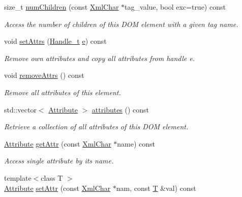 \begin{DoxyCompactItemize}
size\+\_\+t \hyperlink{class_d_d4hep_1_1_x_m_l_1_1_element_a48edbe33bd58d2d5aeb6549ed4036d7c}{num\+Children} (const \hyperlink{namespace_d_d4hep_1_1_x_m_l_a09e5d9cc86ed782f6826dfe0778c1815}{Xml\+Char} $\ast$tag\+\_\+value, bool exc=true) const
\begin{DoxyCompactList}\small\item\em Access the number of children of this D\+OM element with a given tag name. \end{DoxyCompactList}\item 
void \hyperlink{class_d_d4hep_1_1_x_m_l_1_1_element_a8209334be87a35551bbd6d4d8f7cbba4}{set\+Attrs} (\hyperlink{class_d_d4hep_1_1_x_m_l_1_1_handle__t}{Handle\+\_\+t} \hyperlink{_volumes_8cpp_a8a9a1f93e9b09afccaec215310e64142}{e}) const
\begin{DoxyCompactList}\small\item\em Remove own attributes and copy all attributes from handle \textquotesingle{}e\textquotesingle{}. \end{DoxyCompactList}\item 
void \hyperlink{class_d_d4hep_1_1_x_m_l_1_1_element_aad0a776742e12a27fba79e9dcfd06d23}{remove\+Attrs} () const
\begin{DoxyCompactList}\small\item\em Remove all attributes of this element. \end{DoxyCompactList}\item 
std\+::vector$<$ \hyperlink{namespace_d_d4hep_1_1_x_m_l_a5c19b7116be99d69b4b22d911357baaf}{Attribute} $>$ \hyperlink{class_d_d4hep_1_1_x_m_l_1_1_element_ad05f4b2cf50610eb99d6de189ac9b697}{attributes} () const
\begin{DoxyCompactList}\small\item\em Retrieve a collection of all attributes of this D\+OM element. \end{DoxyCompactList}\item 
\hyperlink{namespace_d_d4hep_1_1_x_m_l_a5c19b7116be99d69b4b22d911357baaf}{Attribute} \hyperlink{class_d_d4hep_1_1_x_m_l_1_1_element_a622430e78449e18efb037fec313a763e}{get\+Attr} (const \hyperlink{namespace_d_d4hep_1_1_x_m_l_a09e5d9cc86ed782f6826dfe0778c1815}{Xml\+Char} $\ast$name) const
\begin{DoxyCompactList}\small\item\em Access single attribute by it\textquotesingle{}s name. \end{DoxyCompactList}\item 
{\footnotesize template$<$class T $>$ }\\\hyperlink{namespace_d_d4hep_1_1_x_m_l_a5c19b7116be99d69b4b22d911357baaf}{Attribute} \hyperlink{class_d_d4hep_1_1_x_m_l_1_1_element_afdd37ff40f7d2a336e01f5fb70d50c5e}{set\+Attr} (const \hyperlink{namespace_d_d4hep_1_1_x_m_l_a09e5d9cc86ed782f6826dfe0778c1815}{Xml\+Char} $\ast$nam, const \hyperlink{class_t}{T} \&val) const

\end{DoxyCompactItemize}
